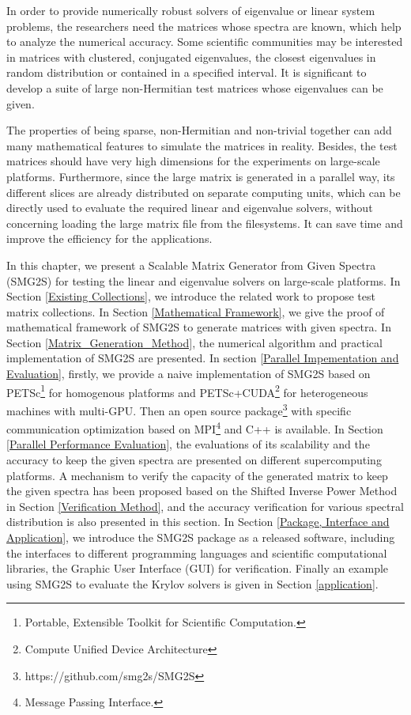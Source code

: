 In order to provide numerically robust solvers of eigenvalue or linear system problems, the researchers need the matrices whose spectra are known, which help to analyze the numerical accuracy. Some scientific communities may be interested in matrices with clustered, conjugated eigenvalues, the closest eigenvalues in random distribution or contained in a specified interval. It is significant to develop a suite of large non-Hermitian test matrices whose eigenvalues can be given.

The properties of being sparse, non-Hermitian and non-trivial together can add many mathematical features to simulate the matrices in reality. Besides, the test matrices should have very high dimensions for the experiments on large-scale platforms. Furthermore, since the large matrix is generated in a parallel way, its different slices are already distributed on separate computing units, which can be directly used to evaluate the required linear and eigenvalue solvers, without concerning loading the large matrix file from the filesystems. It can save time and improve the efficiency for the applications.

In this chapter, we present a Scalable Matrix Generator from Given Spectra (SMG2S) for testing the linear and eigenvalue solvers on large-scale platforms. In Section \ref{Existing Collections}, we introduce the related work to propose test matrix collections. In Section \ref{Mathematical Framework}, we give the proof of mathematical framework of SMG2S to generate matrices with given spectra. In Section \ref{Matrix_Generation_Method}, the numerical algorithm and practical implementation of SMG2S are presented. In section \ref{Parallel Impementation and Evaluation}, firstly, we provide a naive implementation of SMG2S based on PETSc\footnote{Portable, Extensible Toolkit for Scientific Computation.} for homogenous platforms and PETSc+CUDA\footnote{Compute Unified Device Architecture} for heterogeneous machines with multi-GPU. Then an open source package\footnote{https://github.com/smg2s/SMG2S} with specific communication optimization based on MPI\footnote{Message Passing Interface.} and C++ is available.  In Section \ref{Parallel Performance Evaluation}, the evaluations of its scalability and the accuracy to keep the given spectra are presented on different supercomputing platforms.  A mechanism to verify the capacity of the generated matrix to keep the given spectra has been proposed based on the Shifted Inverse Power Method in Section \ref{Verification Method}, and the accuracy verification for various spectral distribution is also presented in this section. In Section \ref{Package, Interface and Application}, we introduce the SMG2S package as a released software, including the interfaces to different programming languages and scientific computational libraries, the Graphic User Interface (GUI) for verification. Finally an example using SMG2S to evaluate the Krylov solvers is given in Section \ref{application}. 

